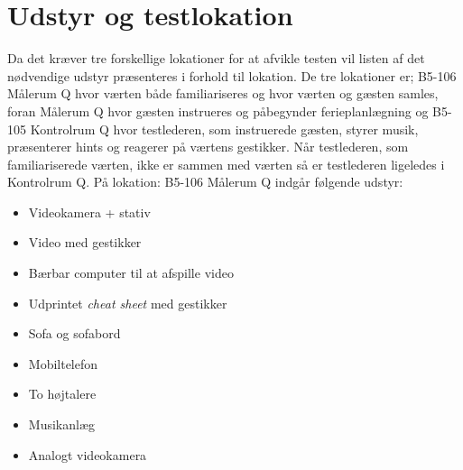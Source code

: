 \section{Udstyr og testlokation}
\label{UdstyrLokationSocialAccept}
%
Da det kræver tre forskellige lokationer for at afvikle testen vil listen af det nødvendige udstyr præsenteres i forhold til lokation. De tre lokationer er; B5-106 Målerum Q hvor værten både familiariseres og hvor værten og gæsten samles, foran Målerum Q hvor gæsten instrueres og påbegynder ferieplanlægning og B5-105 Kontrolrum Q hvor testlederen, som instruerede gæsten, styrer musik, præsenterer hints og reagerer på værtens gestikker. Når testlederen, som familiariserede værten, ikke er sammen med værten så er testlederen ligeledes i Kontrolrum Q. \blankline
%
På lokation: B5-106 Målerum Q indgår følgende udstyr: 
\begin{itemize}
\item Videokamera + stativ
\item Video med gestikker
\item Bærbar computer til at afspille video
\item Udprintet \textit{cheat sheet} med gestikker
\item Sofa og sofabord
\item Mobiltelefon
\item To højtalere 
\item Musikanlæg
\item Analogt videokamera\blankline
\noindent
\end{itemize}
%
